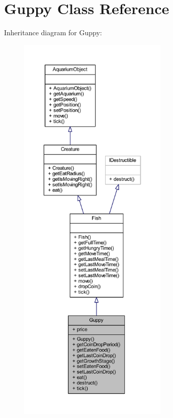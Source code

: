 \hypertarget{class_guppy}{}\section{Guppy Class Reference}
\label{class_guppy}


Inheritance diagram for Guppy\+:
\nopagebreak
\begin{figure}[H]
\begin{center}
\leavevmode
\includegraphics[height=550pt]{class_guppy__inherit__graph}
\end{center}
\end{figure}


